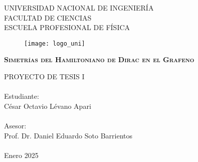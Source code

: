 \begin{titlepage}

	\begin{center}
		\begin{large}
			UNIVERSIDAD NACIONAL DE INGENIERÍA \\
			FACULTAD DE CIENCIAS\\
			ESCUELA PROFESIONAL DE FÍSICA\\
		\end{large}
	\end{center}

	\begin{figure}[htb]
		\begin{center}
			\texttt{[image: logo\_uni]}
		\end{center}
	\end{figure}

	\begin{center}
		\vspace{0.1in}
		\begin{large}
			\scshape{\textbf{Simetrías del Hamiltoniano de Dirac en el Grafeno}}
		\end{large}
		\vspace{0.1in}
	\end{center}

	\begin{center}
		\begin{large}
			PROYECTO DE TESIS I\\ \ \\%

			\vspace{0.3in}
			Estudiante:\\
			César Octavio Lévano Apari\\ \ \\
			Asesor:\\
			Prof. Dr. Daniel Eduardo Soto Barrientos\\ \ \\
			\vspace{0.3in}
			Enero 2025
		\end{large}
	\end{center}
\end{titlepage}
\newpage
$\ $
\thispagestyle{empty} %
\newpage


